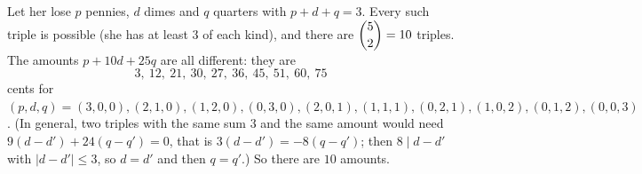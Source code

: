 Let her lose $p$ pennies, $d$ dimes and $q$ quarters with $p+d+q=3$. Every such triple is possible (she has at least $3$ of each kind), and there are $\dbinom{5}{2}=10$ triples. The amounts $p+10d+25q$ are all different: they are
\[
3,\ 12,\ 21,\ 30,\ 27,\ 36,\ 45,\ 51,\ 60,\ 75
\]
cents for $(p,d,q)=(3,0,0),(2,1,0),(1,2,0),(0,3,0),(2,0,1),(1,1,1),(0,2,1),(1,0,2),(0,1,2),(0,0,3)$. (In general, two triples with the same sum $3$ and the same amount would need $9(d-d')+24(q-q')=0$, that is $3(d-d')=-8(q-q')$; then $8\mid d-d'$ with $|d-d'|\le3$, so $d=d'$ and then $q=q'$.) So there are $\boxed{10}$ amounts.
